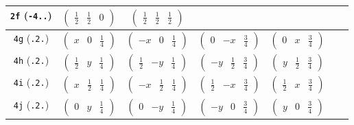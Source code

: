 \documentclass[fleqn,9pt,landscape]{jsarticle}
\begin{document}
\begin{center}
\begin{longtable}{ccccccc}
{\tt 2f} ({\tt -4..}) & $ \begin{pmatrix} \frac{1}{2} & \frac{1}{2} & 0 \end{pmatrix} $ & $ \begin{pmatrix} \frac{1}{2} & \frac{1}{2} & \frac{1}{2} \end{pmatrix} $ & $  $ & $  $ & $  $ & $  $ \\ \hline
{\tt 4g} ({\tt .2.}) & $ \begin{pmatrix} x & 0 & \frac{1}{4} \end{pmatrix} $ & $ \begin{pmatrix} - x & 0 & \frac{1}{4} \end{pmatrix} $ & $ \begin{pmatrix} 0 & - x & \frac{3}{4} \end{pmatrix} $ & $ \begin{pmatrix} 0 & x & \frac{3}{4} \end{pmatrix} $ & $  $ & $  $ \\ \hline
{\tt 4h} ({\tt .2.}) & $ \begin{pmatrix} \frac{1}{2} & y & \frac{1}{4} \end{pmatrix} $ & $ \begin{pmatrix} \frac{1}{2} & - y & \frac{1}{4} \end{pmatrix} $ & $ \begin{pmatrix} - y & \frac{1}{2} & \frac{3}{4} \end{pmatrix} $ & $ \begin{pmatrix} y & \frac{1}{2} & \frac{3}{4} \end{pmatrix} $ & $  $ & $  $ \\ \hline
{\tt 4i} ({\tt .2.}) & $ \begin{pmatrix} x & \frac{1}{2} & \frac{1}{4} \end{pmatrix} $ & $ \begin{pmatrix} - x & \frac{1}{2} & \frac{1}{4} \end{pmatrix} $ & $ \begin{pmatrix} \frac{1}{2} & - x & \frac{3}{4} \end{pmatrix} $ & $ \begin{pmatrix} \frac{1}{2} & x & \frac{3}{4} \end{pmatrix} $ & $  $ & $  $ \\ \hline
{\tt 4j} ({\tt .2.}) & $ \begin{pmatrix} 0 & y & \frac{1}{4} \end{pmatrix} $ & $ \begin{pmatrix} 0 & - y & \frac{1}{4} \end{pmatrix} $ & $ \begin{pmatrix} - y & 0 & \frac{3}{4} \end{pmatrix} $ & $ \begin{pmatrix} y & 0 & \frac{3}{4} \end{pmatrix} $ & $  $ & $  $ \\ \hline

\end{longtable}
\end{center}
\end{document}
